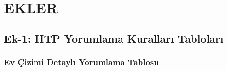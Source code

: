 
\appendix
\chapter{EKLER}

\section{Ek-1: HTP Yorumlama Kuralları Tabloları}

\subsection{Ev Çizimi Detaylı Yorumlama Tablosu}

